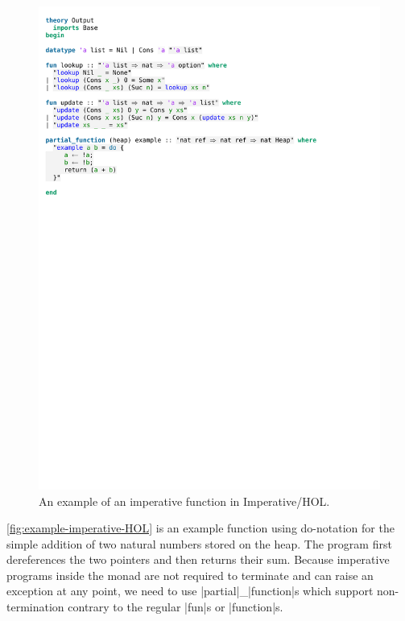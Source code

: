 \begin{figure}[htpb]
    \includegraphics[trim={0 18,9cm 0 8cm}, clip, width=1.00\textwidth]{figures/Theory_Intro.pdf}
    \caption[Imperative/HOL Example]{An example of an imperative function in Imperative/HOL.}
    \label{fig:example-imperative-HOL}
\end{figure}

\noindent \autoref{fig:example-imperative-HOL} is an example function using do-notation for the simple addition of two natural numbers stored on the heap. The program first dereferences the two pointers and then returns their sum. 
Because imperative programs inside the monad are not required to terminate and can raise an exception at any point, we need to use |partial|\_|function|s \parencite[p.263]{wenzel2004isabelle} which support non-termination contrary to the regular |fun|s or |function|s.

